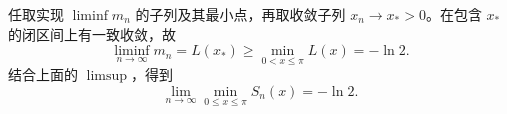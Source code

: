 \begin{xsolution}
任取实现 $\liminf m_n$ 的子列及其最小点，再取收敛子列 $x_n\to x_*>0$。在包含 $x_*$ 的闭区间上有一致收敛，故
\[
  \liminf_{n\to\infty}m_n=L(x_*)
  \ge\min_{0<x\le\pi}L(x)=-\ln2.
\]
结合上面的 $\limsup$，得到
\[
  \boxed{\displaystyle
  \lim_{n\to\infty}\min_{0\le x\le\pi}S_n(x)=-\ln2 }.
\]
\end{xsolution}

